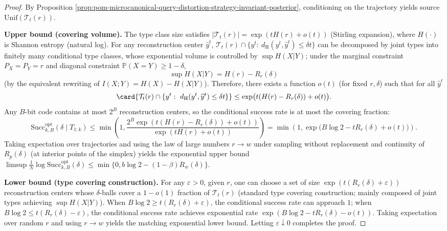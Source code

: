 \begin{proof}
By Proposition \ref{prop:pom-microcanonical-query-distortion-strategy-invariant-posterior}, conditioning on the trajectory yields source \(\mathrm{Unif}(\mathcal{T}_t(r))\).
\par
\textbf{Upper bound (covering volume).}
The type class size satisfies \(|\mathcal{T}_t(r)|=\exp(tH(r)+o(t))\) (Stirling expansion), where \(H(\cdot)\) is Shannon entropy (natural log).
For any reconstruction center \(\widehat y^t\),
\(\mathcal{T}_t(r)\cap\{y^t:\ d_{\mathrm H}(y^t,\widehat y^t)\le \delta t\}\)
can be decomposed by joint types into finitely many conditional type classes, whose exponential volume is controlled by \(\sup H(X|Y)\);
under the marginal constraint \(P_X=P_Y=r\) and diagonal constraint \(\mathbb{P}(X=Y)\ge 1-\delta\),
\[
\sup H(X|Y)=H(r)-R_r(\delta)
\]
(by the equivalent rewriting of \(I(X;Y)=H(X)-H(X|Y)\)).
Therefore, there exists a function \(o(t)\) (for fixed \(r,\delta\)) such that for all \(\widehat y^t\)
\[
\card{\mathcal{T}_t(r)\cap\{y^t:\ d_{\mathrm H}(y^t,\widehat y^t)\le \delta t\}}
\le \exp\bigl(t(H(r)-R_r(\delta))+o(t)\bigr).
\]
Any \(B\)-bit code contains at most \(2^B\) reconstruction centers, so the conditional success rate is at most the covering fraction:
\[
\mathrm{Succ}^{\mathrm{opt}}_{k,B}(\delta\mid T_{1:k})
\le
\min\!\left(1,\frac{2^B\exp(t(H(r)-R_r(\delta))+o(t))}{\exp(tH(r)+o(t))}\right)
=\min\!\left(1,\exp\bigl(B\log 2-tR_r(\delta)+o(t)\bigr)\right).
\]
Taking expectation over trajectories and using the law of large numbers \(r\to w\) under sampling without replacement and continuity of \(R_p(\delta)\) (at interior points of the simplex) yields the exponential upper bound
\(\limsup \frac1N\log \mathrm{Succ}^{\mathrm{opt}}_{k,B}(\delta)\le \min\{0,b\log 2-(1-\beta)R_w(\delta)\}\).
\par
\textbf{Lower bound (type covering construction).}
For any \(\varepsilon>0\), given \(r\), one can choose a set of size \(\exp(t(R_r(\delta)+\varepsilon))\) reconstruction centers whose \(\delta\)-balls cover a \(1-o(1)\) fraction of \(\mathcal{T}_t(r)\) (standard type covering construction; mainly composed of joint types achieving \(\sup H(X|Y)\)).
When \(B\log 2\ge t(R_r(\delta)+\varepsilon)\), the conditional success rate can approach \(1\); when \(B\log 2\le t(R_r(\delta)-\varepsilon)\), the conditional success rate achieves exponential rate
\(\exp(B\log 2-tR_r(\delta)-o(t))\).
Taking expectation over random \(r\) and using \(r\to w\) yields the matching exponential lower bound.
Letting \(\varepsilon\downarrow 0\) completes the proof.
\end{proof}


